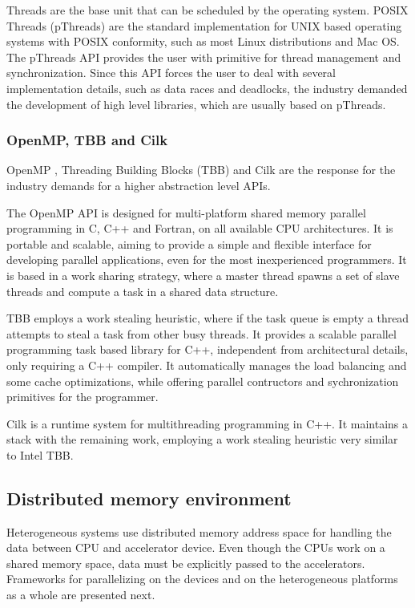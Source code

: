 Threads are the base unit that can be scheduled by the operating system. POSIX Threads (pThreads) are the standard implementation for UNIX based operating systems with POSIX conformity, such as most Linux distributions and Mac OS. The pThreads API provides the user with primitive for thread management and synchronization. Since this API forces the user to deal with several implementation details, such as data races and deadlocks, the industry demanded the development of high level libraries, which are usually based on pThreads.

\subsubsection*{OpenMP, TBB and Cilk}
\label{OpenMP}

OpenMP \cite{OpenMP}, \intel Threading Building Blocks (TBB) \cite{Intel:TBB} and Cilk \cite{Cilk} are the response for the industry demands for a higher abstraction level APIs.

The OpenMP API is designed for multi-platform shared memory parallel programming in C, C++ and Fortran, on all available CPU architectures. It is portable and scalable, aiming to provide a simple and flexible interface for developing parallel applications, even for the most inexperienced programmers. It is based in a work sharing strategy, where a master thread spawns a set of slave threads and compute a task in a shared data structure.

\intel TBB employs a work stealing heuristic, where if the task queue is empty a thread attempts to steal a task from other busy threads. It provides a scalable parallel programming task based library for C++, independent from architectural details, only requiring a C++ compiler. It automatically manages the load balancing and some cache optimizations, while offering parallel contructors and sychronization primitives for the programmer.

Cilk is a runtime system for multithreading programming in C++. It maintains a stack with the remaining work, employing a work stealing heuristic very similar to Intel TBB.

\subsection{Distributed memory environment}
\label{HeterogeneousFrameworks}

Heterogeneous systems use distributed memory address space for handling the data between CPU and accelerator device. Even though the CPUs work on a shared memory space, data must be explicitly passed to the accelerators. Frameworks for parallelizing on the devices and on the heterogeneous platforms as a whole are presented next.

